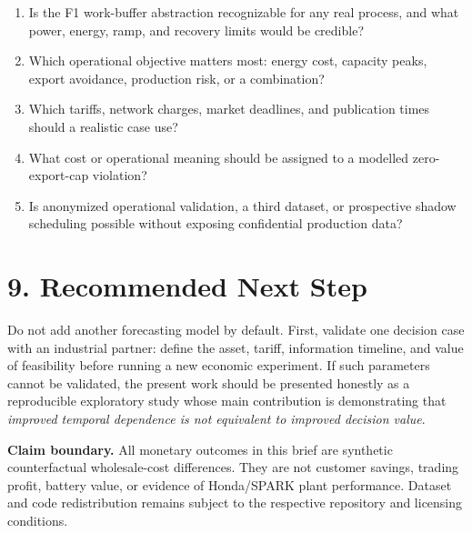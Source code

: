 \documentclass[10pt,a4paper]{article}
\begin{document}
\begin{enumerate}
  \item Is the F1 work-buffer abstraction recognizable for any real process, and
  what power, energy, ramp, and recovery limits would be credible?
  \item Which operational objective matters most: energy cost, capacity peaks,
  export avoidance, production risk, or a combination?
  \item Which tariffs, network charges, market deadlines, and publication times
  should a realistic case use?
  \item What cost or operational meaning should be assigned to a modelled
  zero-export-cap violation?
  \item Is anonymized operational validation, a third dataset, or prospective
  shadow scheduling possible without exposing confidential production data?
\end{enumerate}

\section*{9. Recommended Next Step}

Do not add another forecasting model by default. First, validate one decision
case with an industrial partner: define the asset, tariff, information timeline,
and value of feasibility before running a new economic experiment. If such
parameters cannot be validated, the present work should be presented honestly
as a reproducible exploratory study whose main contribution is demonstrating
that \emph{improved temporal dependence is not equivalent to improved decision
value}.

\vfill
{\footnotesize\textbf{Claim boundary.} All monetary outcomes in this brief are
synthetic counterfactual wholesale-cost differences. They are not customer
savings, trading profit, battery value, or evidence of Honda/SPARK plant
performance. Dataset and code redistribution remains subject to the respective
repository and licensing conditions.}
\end{document}
